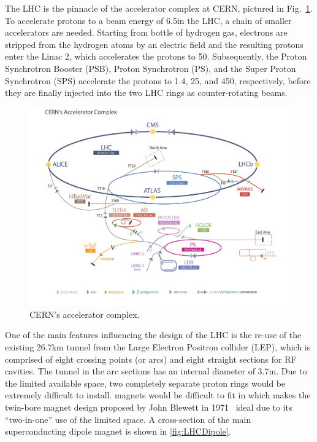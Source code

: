 The LHC is the pinnacle of the accelerator
complex at CERN, pictured in Fig.~\ref{fig:LHCComplex}.  To accelerate
protons to a beam energy of 6.5\TeV in the LHC, a chain of smaller
accelerators are needed. Starting from bottle of hydrogen gas,
electrons are stripped from the hydrogen atoms by an electric field
and the resulting protons enter the Linac 2, which accelerates the
protons to 50\MeV. Subsequently, the Proton Synchrotron Booster (PSB), Proton Synchrotron (PS), and the
Super Proton Synchrotron (SPS) accelerate the protons to 1.4\GeV, 25\GeV, and 450\GeV, respectively, before they are finally injected
into the two LHC rings as counter-rotating beams.

\begin{figure}\centering
\includegraphics[width=.9\textwidth]{figs/cms/LHC_default.jpg}
\caption{CERN's accelerator complex.\label{fig:LHCComplex}}
\end{figure}

One of the main features influencing the design of the LHC is the re-use of the
existing 26.7\unit{km} tunnel from the Large Electron Positron collider (LEP), which is
comprised of eight crossing points (or arcs) and eight straight sections for
RF cavities. The tunnel in the arc sections has an internal diameter of 3.7\unit{m}. Due to the limited available space, two completely separate
proton rings would be extremely difficult to install.  magnets
would be  difficult to fit in which makes the twin-bore magnet design proposed by John
Blewett in 1971~\cite{Blewett:1068131} ideal due to its
``two-in-one'' use of the limited space. A cross-section of the main superconducting
dipole magnet is shown in \ref{fig:LHCDipole}.

